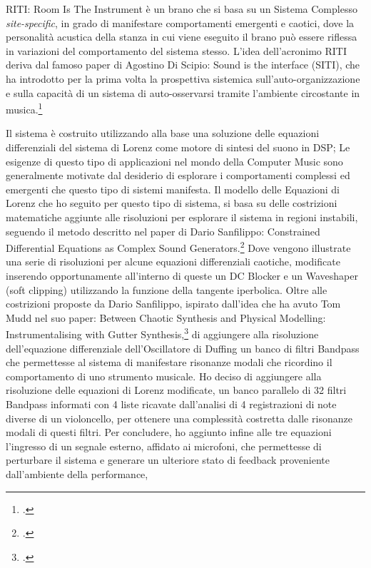 RITI: Room Is The Instrument è un brano che si basa su un Sistema Complesso \textit{site-specific},
in grado di manifestare comportamenti emergenti e caotici,
dove la personalità acustica della stanza in cui viene eseguito il brano può
essere riflessa in variazioni del comportamento del sistema stesso.
L'idea dell'acronimo RITI deriva dal famoso paper di Agostino Di Scipio: 
Sound is the interface (SITI), 
che ha introdotto per la prima volta la prospettiva sistemica 
sull'auto-organizzazione e sulla capacità di un sistema di auto-osservarsi 
tramite l'ambiente circostante in musica.\footcite{di_scipio_sound_2003} 

Il sistema è costruito utilizzando alla base una soluzione 
delle equazioni differenziali del sistema di Lorenz come motore di sintesi del suono in DSP;
Le esigenze di questo tipo di applicazioni nel mondo della Computer Music
sono generalmente motivate dal desiderio di esplorare i comportamenti complessi ed emergenti
che questo tipo di sistemi manifesta.
Il modello delle Equazioni di Lorenz che ho seguito per questo tipo di sistema, si basa
su delle costrizioni matematiche aggiunte alle risoluzioni
per esplorare il sistema in regioni instabili, 
seguendo il metodo descritto nel paper di Dario Sanfilippo: 
Constrained Differential Equations as Complex Sound Generators.\footcite{sanfilippo_constrained_2021} 
Dove vengono illustrate una serie di risoluzioni per alcune 
equazioni differenziali caotiche,
modificate inserendo opportunamente all'interno di queste un
DC Blocker e un Waveshaper (soft clipping) utilizzando la funzione della tangente iperbolica.
Oltre alle costrizioni proposte da Dario Sanfilippo, 
ispirato dall'idea che ha avuto Tom Mudd nel suo paper:
Between Chaotic Synthesis and Physical Modelling: Instrumentalising with Gutter Synthesis,\footcite{tom_mudd_gutter_synthesis}
di aggiungere alla risoluzione dell'equazione differenziale dell'Oscillatore di Duffing
un banco di filtri Bandpass che permettesse al sistema di manifestare
risonanze modali che ricordino il comportamento di uno strumento musicale.
Ho deciso di aggiungere alla risoluzione delle equazioni di Lorenz modificate,
un banco parallelo di 32 filtri Bandpass informati 
con 4 liste ricavate dall'analisi di 4 registrazioni di note diverse di un violoncello, 
per ottenere una complessità costretta dalle risonanze modali di questi filtri.
Per concludere, ho aggiunto infine alle tre equazioni l'ingresso di un segnale esterno, 
affidato ai microfoni, 
che permettesse di perturbare il sistema e generare un ulteriore stato 
di feedback proveniente dall'ambiente della performance,
